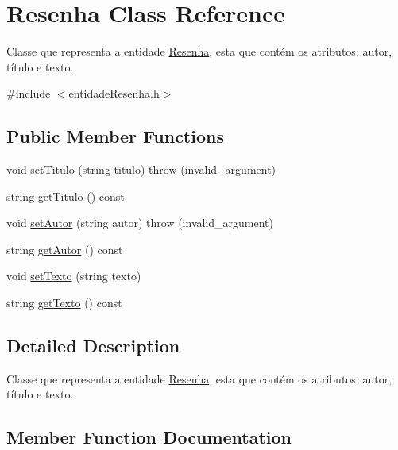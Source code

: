 \hypertarget{classResenha}{}\section{Resenha Class Reference}
\label{classResenha}


Classe que representa a entidade \hyperlink{classResenha}{Resenha}, esta que contém os atributos\+: autor, título e texto.  




{\ttfamily \#include $<$entidade\+Resenha.\+h$>$}

\subsection*{Public Member Functions}
\begin{DoxyCompactItemize}
\item 
void \hyperlink{classResenha_aa2e063e37df9f280258bf1bb492bf818}{set\+Titulo} (string titulo)  throw (invalid\+\_\+argument)
\item 
string \hyperlink{classResenha_a8c0966bc51ba8d43c769594446797d9f}{get\+Titulo} () const
\item 
void \hyperlink{classResenha_a5c12319c40b3001ba8b6771e2a86285b}{set\+Autor} (string autor)  throw (invalid\+\_\+argument)
\item 
string \hyperlink{classResenha_a9ba7b00c49de97e2c29caba9b229dfab}{get\+Autor} () const
\item 
void \hyperlink{classResenha_ad760365db2202742706238d74fe55e6e}{set\+Texto} (string texto)
\item 
string \hyperlink{classResenha_a17b193d598f0b50f90310a67afc0b524}{get\+Texto} () const
\end{DoxyCompactItemize}


\subsection{Detailed Description}
Classe que representa a entidade \hyperlink{classResenha}{Resenha}, esta que contém os atributos\+: autor, título e texto. 

\subsection{Member Function Documentation}
\mbox{\label{classResenha_a9ba7b00c49de97e2c29caba9b229dfab}} 
